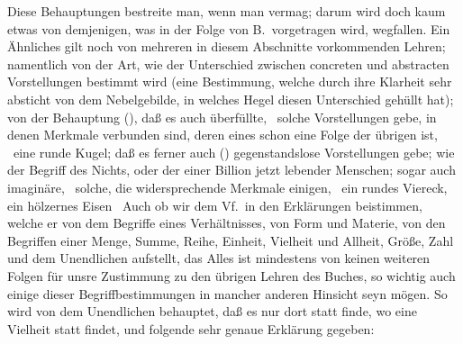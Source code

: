 Diese Behauptungen bestreite man, wenn man vermag; darum wird doch kaum etwas von demjenigen, was in der Folge von B.\ vorgetragen wird, wegfallen. Ein Ähnliches gilt noch von mehreren in diesem Abschnitte vorkommenden Lehren; namentlich von der Art, wie  der Unterschied zwischen concreten und abstracten Vorstellungen bestimmt wird (eine Bestimmung, welche durch ihre Klarheit sehr absticht von dem Nebelgebilde, in welches Hegel diesen Unterschied gehüllt hat); von der Behauptung (), daß es auch überfüllte, \dh\  solche Vorstellungen gebe, in denen Merkmale verbunden sind, deren eines schon eine Folge der übrigen ist, \zB\ eine runde Kugel; daß es ferner auch () gegenstandslose Vorstellungen gebe; wie der Begriff des Nichts, oder der einer Billion jetzt lebender Menschen; sogar auch imaginäre, \dh\  solche, die widersprechende Merkmale einigen, \zB\ ein rundes Viereck, ein hölzernes Eisen \udgl\  Auch ob wir dem Vf.\ in den Erklärungen beistimmen, welche er  von dem Begriffe eines Verhältnisses,  von Form und Materie,  von den Begriffen einer Menge, Summe, Reihe, Einheit, Vielheit und Allheit, Größe, Zahl und dem Unendlichen aufstellt, das Alles ist mindestens von keinen weiteren Folgen für unsre Zustimmung zu den übrigen Lehren des Buches, so wichtig auch einige dieser Begriffbestimmungen in mancher anderen Hinsicht seyn mögen. So wird von dem Unendlichen behauptet, daß es nur dort statt finde, wo eine Vielheit statt findet, und folgende sehr genaue Erklärung gegeben: 
